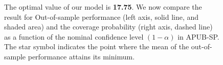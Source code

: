 \documentclass[11pt]{article}
\begin{document}
\begin{figure}[htbp]
	\begin{center}
		\caption{The optimal value of our model is \textbf{17.75}. We now compare the result for Out-of-sample performance (left axis, solid line, and shaded area) and the coverage probability (right axis, dashed line) as a function of the nominal confidence level $(1-\alpha)$ in APUB-SP. The star symbol indicates the point where the mean of the out-of-sample performance attains its minimum.  } \label{fig:RR-APUB} 
	\end{center}
\end{figure}



\newpage
\end{document}
